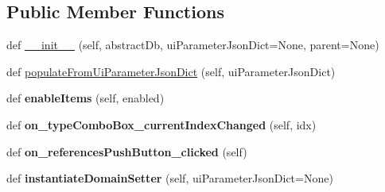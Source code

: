 \subsection*{Public Member Functions}
\begin{DoxyCompactItemize}
\item 
def \mbox{\hyperlink{class_dsg_tools_1_1_custom_widgets_1_1_custom_db_management_widgets_1_1add_attribute_widget_1_1_add_attribute_widget_a6f31a57b65c10d512b31daa5e6185a2a}{\+\_\+\+\_\+init\+\_\+\+\_\+}} (self, abstract\+Db, ui\+Parameter\+Json\+Dict=None, parent=None)
\item 
def \mbox{\hyperlink{class_dsg_tools_1_1_custom_widgets_1_1_custom_db_management_widgets_1_1add_attribute_widget_1_1_add_attribute_widget_a878e493b127050a4241892d85d437e9e}{populate\+From\+Ui\+Parameter\+Json\+Dict}} (self, ui\+Parameter\+Json\+Dict)
\item 
\mbox{\label{class_dsg_tools_1_1_custom_widgets_1_1_custom_db_management_widgets_1_1add_attribute_widget_1_1_add_attribute_widget_ad8bb74e96b84e8e5200778ca44973e7f}} 
def {\bfseries enable\+Items} (self, enabled)
\item 
\mbox{\label{class_dsg_tools_1_1_custom_widgets_1_1_custom_db_management_widgets_1_1add_attribute_widget_1_1_add_attribute_widget_a9e7282fb120af6072be27c8c032738f0}} 
def {\bfseries on\+\_\+type\+Combo\+Box\+\_\+current\+Index\+Changed} (self, idx)
\item 
\mbox{\label{class_dsg_tools_1_1_custom_widgets_1_1_custom_db_management_widgets_1_1add_attribute_widget_1_1_add_attribute_widget_a6b7f0818004a3667b41328e61e50e075}} 
def {\bfseries on\+\_\+references\+Push\+Button\+\_\+clicked} (self)
\item 
\mbox{\label{class_dsg_tools_1_1_custom_widgets_1_1_custom_db_management_widgets_1_1add_attribute_widget_1_1_add_attribute_widget_a88833bbb7b9b121d1f696c9fe0498e9e}} 
def {\bfseries instantiate\+Domain\+Setter} (self, ui\+Parameter\+Json\+Dict=None)

\end{DoxyCompactItemize}

